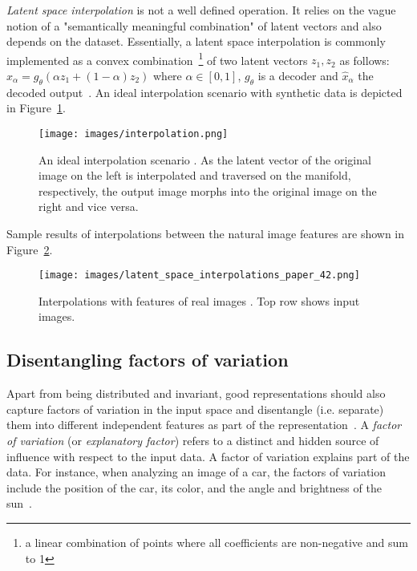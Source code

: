 \documentclass[12pt,a4paper]{article}
\begin{document}
\textit{Latent space interpolation} is not a well defined operation. It relies on the vague notion of a "semantically meaningful combination" of latent vectors and also depends on the dataset. Essentially, a latent space interpolation is commonly implemented as a convex combination~\footnote{a linear combination of points where all coefficients are non-negative and sum to 1} of two latent vectors $z_1, z_2$ as follows: $\hat{x}_{\alpha} = g_{\theta}(\alpha z_1+(1-\alpha)z_2)$ where $\alpha \in [0,1]$, $g_{\theta}$ is a decoder and $\hat{x}_{\alpha}$ the decoded output~\cite{AE_Interp}. An ideal interpolation scenario with synthetic data is depicted in Figure~\ref{fig:interpolation_ideal}.
\begin{figure}[ht]
\centering
\texttt{[image: images/interpolation.png]}
\caption{An ideal interpolation scenario \cite{InkscapeInterpolation}. As the latent vector of the original image on the left is interpolated and traversed on the manifold, respectively, the output image morphs into the original image on the right and vice versa.}
\label{fig:interpolation_ideal}
\end{figure}

Sample results of interpolations between the natural image features are shown in Figure~\ref{fig:interpolation_real}.
\begin{figure}[ht]
\centering
\texttt{[image: images/latent\_space\_interpolations\_paper\_42.png]}
\caption{Interpolations with features of real images \cite{InterpolExamples}. Top row shows input images.}
\label{fig:interpolation_real}
\end{figure}


\subsection{Disentangling factors of variation}\label{subsec:unsupDFoV}
Apart from being distributed and invariant, good representations should also capture factors of variation in the input space and disentangle (i.e. separate) them into different independent features as part of the representation~\cite{ReprLearning}. A \textit{factor of variation} (or \textit{explanatory factor}) refers to a distinct and hidden source of influence with respect to the input data. A factor of variation explains part of the data. For instance, when analyzing an image of a car, the factors of variation include the position of the car, its color, and the angle and brightness of the sun~\cite{DeepLearningBook}.
\end{document}
